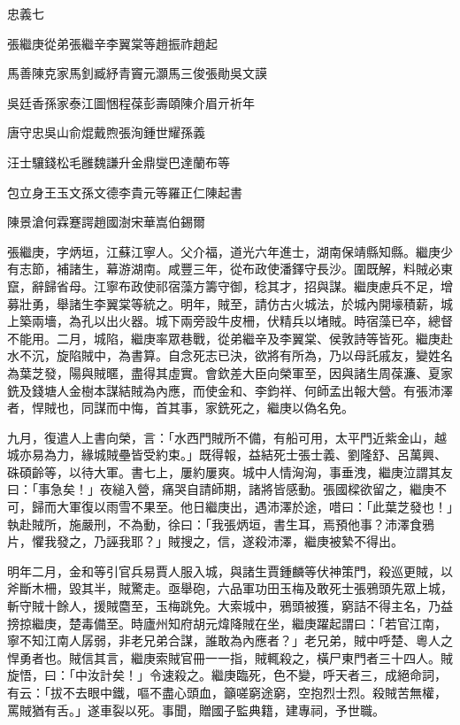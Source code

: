
\begin{pinyinscope}
忠義七

張繼庚從弟張繼辛李翼棠等趙振祚趙起

馬善陳克家馬釗臧紓青竇元灝馬三俊張勛吳文謨

吳廷香孫家泰江圖悃程葆彭壽頤陳介眉亓祈年

唐守忠吳山俞焜戴煦張洵鍾世耀孫義

汪士驤錢松毛雝魏謙升金鼎燮巴達蘭布等

包立身王玉文孫文德李貴元等羅正仁陳起書

陳景滄何霖蹇諤趙國澍宋華嵩伯錫爾

張繼庚，字炳垣，江蘇江寧人。父介福，道光六年進士，湖南保靖縣知縣。繼庚少有志節，補諸生，幕游湖南。咸豐三年，從布政使潘鐸守長沙。圍既解，料賊必東竄，辭歸省母。江寧布政使祁宿藻方籌守御，稔其才，招與謀。繼庚慮兵不足，增募壯勇，舉諸生李翼棠等統之。明年，賊至，請仿古火城法，於城內開壕積薪，城上築兩墻，為孔以出火器。城下兩旁設牛皮柵，伏精兵以堵賊。時宿藻已卒，總督不能用。二月，城陷，繼庚率眾巷戰，從弟繼辛及李翼棠、侯敦詩等皆死。繼庚赴水不沉，旋陷賊中，為書算。自念死志已決，欲將有所為，乃以母託戚友，變姓名為葉芝發，陽與賊暱，盡得其虛實。會欽差大臣向榮軍至，因與諸生周葆濂、夏家銑及錢塘人金樹本謀結賊為內應，而使金和、李鈞祥、何師孟出報大營。有張沛澤者，悍賊也，同謀而中悔，首其事，家銑死之，繼庚以偽名免。

九月，復遣人上書向榮，言：「水西門賊所不備，有船可用，太平門近紫金山，越城亦易為力，緣城賊壘皆受約束。」既得報，益結死士張士義、劉隆舒、呂萬興、硃碩齡等，以待大軍。書七上，屢約屢爽。城中人情洶洶，事垂洩，繼庚泣謂其友曰：「事急矣！」夜縋入營，痛哭自請師期，諸將皆感動。張國樑欲留之，繼庚不可，歸而大軍復以雨雪不果至。他日繼庚出，遇沛澤於途，唶曰：「此葉芝發也！」執赴賊所，施嚴刑，不為動，徐曰：「我張炳垣，書生耳，焉預他事？沛澤食鴉片，懼我發之，乃誣我耶？」賊搜之，信，遂殺沛澤，繼庚被縶不得出。

明年二月，金和等引官兵易賈人服入城，與諸生賈鍾麟等伏神策門，殺巡更賊，以斧斷木柵，毀其半，賊驚走。亟舉砲，六品軍功田玉梅及敢死士張鴉頭先眾上城，斬守賊十餘人，援賊麕至，玉梅跳免。大索城中，鴉頭被獲，窮詰不得主名，乃益搒掠繼庚，楚毒備至。時廬州知府胡元煒降賊在坐，繼庚躍起謂曰：「若官江南，寧不知江南人孱弱，非老兄弟合謀，誰敢為內應者？」老兄弟，賊中呼楚、粵人之悍勇者也。賊信其言，繼庚索賊官冊一一指，賊輒殺之，橫尸東門者三十四人。賊旋悟，曰：「中汝計矣！」令速殺之。繼庚臨死，色不變，呼天者三，成絕命詞，有云：「拔不去眼中鐵，嘔不盡心頭血，籲嗟窮途窮，空抱烈士烈。殺賊苦無權，罵賊猶有舌。」遂車裂以死。事聞，贈國子監典籍，建專祠，予世職。


\end{pinyinscope}
